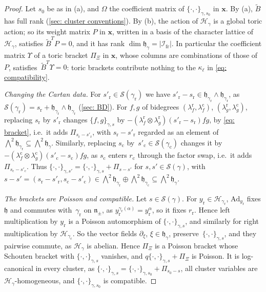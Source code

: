 \documentclass[a4paper]{amsart}
\numberwithin{equation}{section}
\theoremstyle{definition}
\theoremstyle{remark}
\newcommand{\mfh}{\mathfrak{h}}
\newcommand{\mfn}{\mathfrak{n}}
\newcommand{\mcH}{\mathcal{H}}
\newcommand{\mcS}{\mathcal{S}}
\newcommand{\mcI}{\mathcal{I}}
\newcommand{\bx}{\mathbf{x}}
\newcommand{\tB}{\widetilde{B}}
\newcommand{\rr}{\mathrm{r}}
\newcommand{\cc}{\mathrm{c}}
\newcommand{\fr}{\mathrm{fr}}
\newcommand{\toric}{\Pi}
\begin{document}
\begin{proof}
  Let $s_0$ be as in (a), and $\Omega$ the coefficient matrix of $\{\cdot,\cdot\}_{\gamma,s_0}$ in $\bx$.
  By (a), $\tB$ has full rank (\cref{sec: cluster conventions}).
  By (b), the action of $\mcH_\gamma$ is a global toric action; so its weight matrix $P$ in $\bx$, written in a basis of the character lattice of $\mcH_\gamma$, satisfies $\tB^TP=0$, and it has rank $\dim\mfh_\gamma=|\mcI_\fr|$.
  In particular the coefficient matrix $\Upsilon$ of a toric bracket $\toric_\Xi$ in $\bx$, whose columns are combinations of those of $P$, satisfies~$\tB^T\Upsilon=0$: toric brackets contribute nothing to the $\kappa_\ell$ in \eqref{eq: compatibility}.

  \emph{Changing the Cartan data.} For $s'_{\rr}\in\mcS(\gamma_{\rr})$ we have $s'_{\rr}-s_{\rr}\in\mfh_{\gamma_{\rr}}\wedge\mfh_{\gamma_{\rr}}$, as $\mcS(\gamma_{\rr})=s_{\rr}+\mfh_{\gamma_{\rr}}\wedge\mfh_{\gamma_{\rr}}$ (\cref{sec: BD}).
  For $f,g$ of bidegrees $(\lambda^\rr_f,\lambda^\cc_f)$, $(\lambda^\rr_g,\lambda^\cc_g)$, replacing $s_{\rr}$ by $s'_{\rr}$ changes $\{f,g\}_{\gamma,s}$ by $-(\lambda^\rr_f\otimes\lambda^\rr_g)(s'_{\rr}-s_{\rr})fg$, by \eqref{eq: bracket}, i.e.\ it adds $\toric_{s_{\rr}-s'_{\rr}}$, with $s_{\rr}-s'_{\rr}$ regarded as an element of $\bigwedge^2\mfh_{\gamma_{\rr}}\subseteq\bigwedge^2\mfh_\gamma$.
  Similarly, replacing $s_{\cc}$ by~$s'_{\cc}\in\mcS(\gamma_{\cc})$ changes it by $-(\lambda^\cc_f\otimes\lambda^\cc_g)(s'_{\cc}-s_{\cc})fg$, as $s_{\cc}$ enters $r_\cc$ through the factor swap, i.e.\ it adds $\toric_{s_{\cc}-s'_{\cc}}$.
  Thus $\{\cdot,\cdot\}_{\gamma,s'}=\{\cdot,\cdot\}_{\gamma,s}+\toric_{s-s'}$ for $s,s'\in\mcS(\gamma)$, with $s-s'=(s_{\rr}-s'_{\rr},s_{\cc}-s'_{\cc})\in\bigwedge^2\mfh_{\gamma_{\rr}}\oplus\bigwedge^2\mfh_{\gamma_{\cc}}\subseteq\bigwedge^2\mfh_\gamma$.

  \emph{The brackets are Poisson and compatible.} Let $s\in\mcS(\gamma)$.
  For $y_{\rr}\in\mcH_{\gamma_{\rr}}$, $\mathrm{Ad}_{y_{\rr}}$ fixes $\mfh$ and commutes with~$\gamma_{\rr}$ on $\mfn_\pm$, as $y_{\rr}^{\gamma_{\rr}(\alpha)}=y_{\rr}^\alpha$, so it fixes $r_\rr$.
  Hence left multiplication by $y_{\rr}$ is a Poisson automorphism of $\{\cdot,\cdot\}_{\gamma,s}$, and similarly for right multiplication by $\mcH_{\gamma_{\cc}}$.
  So the vector fields $\partial_\xi$, $\xi\in\mfh_\gamma$, preserve~$\{\cdot,\cdot\}_{\gamma,s}$, and they pairwise commute, as $\mcH_\gamma$ is abelian.
  Hence $\toric_\Xi$ is a Poisson bracket whose Schouten bracket with $\{\cdot,\cdot\}_{\gamma,s}$ vanishes, and $q\{\cdot,\cdot\}_{\gamma,s}+\toric_\Xi$ is Poisson.
  It is log-canonical in every cluster, as $\{\cdot,\cdot\}_{\gamma,s}=\{\cdot,\cdot\}_{\gamma,s_0}+\toric_{s_0-s}$, all cluster variables are $\mcH_\gamma$-homogeneous, and $\{\cdot,\cdot\}_{\gamma,s_0}$ is compatible.


\end{proof}
\end{document}
